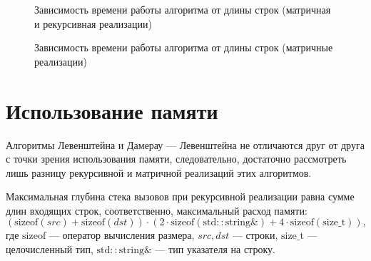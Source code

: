 \begin{figure}
	\centering
	\captionsetup{justification=centering}
	\caption{Зависимость времени работы алгоритма от длины строк (матричная и рекурсивная реализации)}
	\label{plt:runtime_matrix_recursive}
\end{figure}

\begin{figure}
	\centering
	\captionsetup{justification=centering}
	\caption{Зависимость времени работы алгоритма от длины строк (матричные реализации)}
	\label{plt:runtime_matrix_damerau}
\end{figure}

\section{Использование памяти}

Алгоритмы Левенштейна и Дамерау — Левенштейна не отличаются друг от друга с точки зрения использования памяти, следовательно, достаточно рассмотреть лишь разницу рекурсивной и матричной реализаций этих алгоритмов.

Максимальная глубина стека вызовов при рекурсивной реализации равна сумме длин входящих строк, соответственно, максимальный расход памяти:
\[
(\mathrm{sizeof}(src) + \mathrm{sizeof}(dst)) \cdot (2 \cdot \mathrm{sizeof (std\!::\!string\&)} + 4 \cdot \mathrm{sizeof(size\_t)}),
\]
где $\mathrm{sizeof}$ — оператор вычисления размера, $src, dst$ — строки, $\mathrm{size\_t}$ — целочисленный тип, $\mathrm{std\!::\!string\&}$ — тип указателя на строку.

